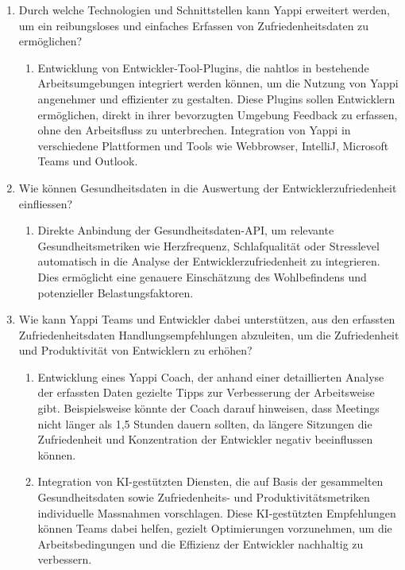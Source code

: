 \documentclass[12pt,a4paper]{report}
\begin{document}
\begin{enumerate}[label=\Alph*.]
  \item Durch welche Technologien und Schnittstellen kann Yappi erweitert werden,
        um ein reibungsloses und einfaches Erfassen von Zufriedenheitsdaten zu ermöglichen?
        \begin{enumerate}[label=\alph*.]
          \item Entwicklung von Entwickler-Tool-Plugins, die nahtlos in bestehende Arbeitsumgebungen
                integriert werden können, um die Nutzung von Yappi angenehmer und effizienter zu gestalten.
                Diese Plugins sollen Entwicklern ermöglichen, direkt in ihrer bevorzugten Umgebung Feedback
                zu erfassen, ohne den Arbeitsfluss zu unterbrechen. Integration von Yappi in verschiedene
                Plattformen und Tools wie Webbrowser, IntelliJ, Microsoft Teams und Outlook.
        \end{enumerate}
  \item Wie können Gesundheitsdaten in die Auswertung der Entwicklerzufriedenheit einfliessen?
        \begin{enumerate}[label=\alph*.]
          \item Direkte Anbindung der Gesundheitsdaten-API, um relevante Gesundheitsmetriken wie
                Herzfrequenz, Schlafqualität oder Stresslevel automatisch in die Analyse der
                Entwicklerzufriedenheit zu integrieren. Dies ermöglicht eine genauere Einschätzung des
                Wohlbefindens und potenzieller Belastungsfaktoren.
        \end{enumerate}
  \item Wie kann Yappi Teams und Entwickler dabei unterstützen, aus den erfassten
        Zufriedenheitsdaten Handlungsempfehlungen abzuleiten, um die Zufriedenheit und Produktivität
        von Entwicklern zu erhöhen?
        \begin{enumerate}[label=\alph*.]
          \item Entwicklung eines Yappi Coach, der anhand einer detaillierten Analyse der erfassten
                Daten gezielte Tipps zur Verbesserung der Arbeitsweise gibt. Beispielsweise könnte der Coach
                darauf hinweisen, dass Meetings nicht länger als 1,5 Stunden dauern sollten, da längere
                Sitzungen die Zufriedenheit und Konzentration der Entwickler negativ beeinflussen können.
          \item Integration von KI-gestützten Diensten, die auf Basis der gesammelten Gesundheitsdaten
                sowie Zufriedenheits- und Produktivitätsmetriken individuelle Massnahmen vorschlagen. Diese
                KI-gestützten Empfehlungen können Teams dabei helfen, gezielt Optimierungen vorzunehmen, um
                die Arbeitsbedingungen und die Effizienz der Entwickler nachhaltig zu verbessern.
        \end{enumerate}
\end{enumerate}
\end{document}
